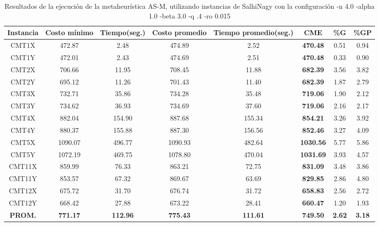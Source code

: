 \begin{table}[h]
\caption{Resultados de la ejecución de la metaheurística AS-M, utilizando instancias de SalhiNagy con la configuración -n 4.0 -alpha 1.0 -beta 3.0 -q .4 -ro 0.015}
\centering
\small
\begin{tabular}{c c c c c c c c}
\hline\hline
Instancia & Costo mínimo & Tiempo(seg.) & Costo promedio & Tiempo promedio(seg.) & CME & \%G & \%GP \\ [0.5ex]
\hline
CMT1X & 472.87 & 2.48 & 
474.89 & 2.52 & \bf{470.48} & 
0.51 & 0.94\\CMT1Y & 472.01 & 2.43 & 
474.69 & 2.51 & \bf{470.48} & 
0.33 & 0.90\\CMT2X & 706.66 & 11.95 & 
708.45 & 11.88 & \bf{682.39} & 
3.56 & 3.82\\CMT2Y & 695.12 & 11.26 & 
701.43 & 11.40 & \bf{682.39} & 
1.87 & 2.79\\CMT3X & 732.71 & 35.86 & 
734.28 & 35.48 & \bf{719.06} & 
1.90 & 2.12\\CMT3Y & 734.62 & 36.93 & 
734.69 & 37.60 & \bf{719.06} & 
2.16 & 2.17\\CMT4X & 882.04 & 154.90 & 
887.68 & 155.34 & \bf{854.21} & 
3.26 & 3.92\\CMT4Y & 880.37 & 155.88 & 
887.30 & 156.56 & \bf{852.46} & 
3.27 & 4.09\\CMT5X & 1090.07 & 496.77 & 
1090.93 & 482.64 & \bf{1030.56} & 
5.77 & 5.86\\CMT5Y & 1072.19 & 469.75 & 
1078.80 & 470.04 & \bf{1031.69} & 
3.93 & 4.57\\CMT11X & 859.99 & 76.33 & 
863.21 & 72.75 & \bf{831.09} & 
3.48 & 3.86\\CMT11Y & 853.57 & 67.32 & 
869.67 & 63.69 & \bf{829.85} & 
2.86 & 4.80\\CMT12X & 675.72 & 31.70 & 
676.74 & 31.72 & \bf{658.83} & 
2.56 & 2.72\\CMT12Y & 668.42 & 27.88 & 
673.22 & 28.41 & \bf{660.47} & 
1.20 & 1.93\\\bf{PROM.} & 
\bf{771.17} & \bf{112.96} & \bf{775.43} & \bf{111.61} & \bf{749.50} & \bf{2.62} & \bf{3.18}\\[1ex]\hline
\end{tabular}
\label{table:nonlin}
\end{table}
